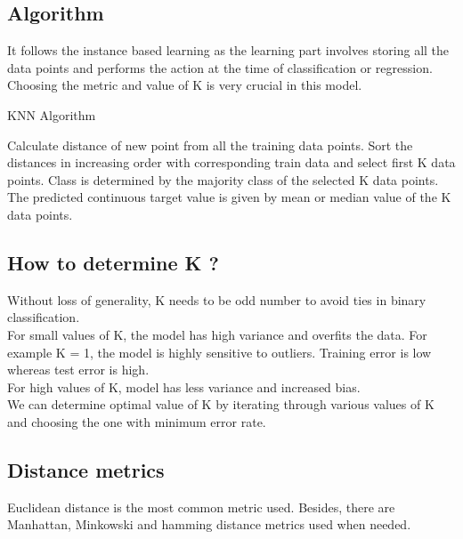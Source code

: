 \documentclass[12pt,letterpaper, onecolumn]{exam}
\begin{document}
\subsection*{Algorithm}
It follows the instance based learning as the learning part involves storing all the data points and performs the action at the time of classification or regression. Choosing the metric and value of K is very crucial in this model.
\begin{algorithm}
\caption{KNN Algorithm}\label{cap}
\begin{algorithmic}

\State Calculate distance of new point from all the training data points.
\State Sort the distances in increasing order with corresponding train data and select first K data points.
\State Class is determined by the majority class of the selected K data points.
\EndIf
{}
\State The predicted continuous target value is given by mean or median value of the K data points.
\EndIf
\end{algorithmic}
\end{algorithm}




\subsection*{How to determine K ?}
Without loss of generality, K needs to be odd number to avoid ties in
binary classification.\\
For small values of K, the model has high variance and overfits the data. For example K = 1, the model is highly sensitive to outliers.
Training error is low whereas test error is high.\\
For high values of K, model has less variance and increased bias.\\
We can determine optimal value of K by iterating through various values of K and choosing the one with minimum error rate.

\subsection*{Distance metrics}
Euclidean distance is the most common metric used. Besides, there are Manhattan, Minkowski and hamming distance metrics used when needed.
\end{document}
